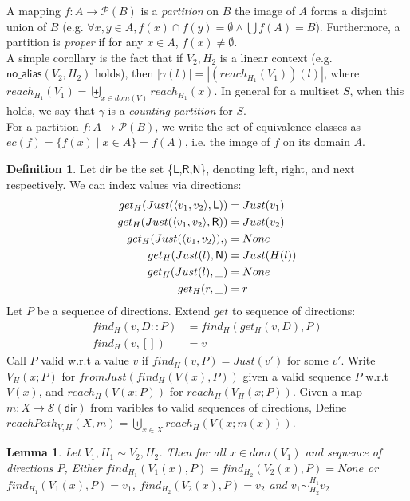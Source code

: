 \documentclass[11pt]{article}
\newcommand{\ms}[1]{\ensuremath{\mathsf{#1}}}
\newcommand{\na}[1]{\mathsf{no\_alias}(#1)}
\newcommand{\veq}[4]{#3 \sim^{#1}_{#2} #4}
\newtheorem{lemma}[theorem]{Lemma}
\theoremstyle{definition}
\newtheorem{definition}{Definition}[section]
\begin{document}
A mapping $f : A \to \mathcal{P}(B)$ is a \emph{partition} on $B$ the image of 
$A$ forms a disjoint union of $B$ 
(e.g. $\forall x,y \in A, f(x) \cap f(y) = \emptyset \land \bigcup f(A) = B$). Furthermore,
a partition is \emph{proper} if for any $x \in A$, $f(x) \neq \emptyset$.\\

A simple corollary is the fact that if $V_2,H_2$ is a linear context (e.g. $\na{V_2,H_2}$ holds), then
$|\gamma(l)| = |(reach_{H_1}(V_1))(l)|$, where $ reach_{H_1}(V_1) = \biguplus_{x \in dom(V)} reach_{H_1}(x)$. 
In general for a multiset $S$, when this holds, we say that 
$\gamma$ is a \emph{counting partition} for $S$.\\

For a partition $f : A \to \mathcal{P}(B)$, we write the set of equivalence classes
as $ec(f) = \{f(x) \mid x \in A\} = f(A)$, i.e. the image of $f$ on its domain $A$.\\

\begin{definition}
	Let \ms{dir} be the set \{\ms{L},\ms{R},\ms{N}\}, denoting left, right, and next 
	respectively. We can index values via directions:
	\begin{align*}
		get_H(Just(\pairexcst{v_1}{v_2},\ms{L})) &= Just(v_1)\\
		get_H(Just(\pairexcst{v_1}{v_2},\ms{R})) &= Just(v_2)\\
		get_H(Just(\pairexcst{v_1}{v_2}),_) &= None\\
		get_H(Just(l),\ms{N}) &= Just(H(l)) \\
		get_H(Just(l), \_) &= None\\
		get_H(r,\_) &= r
	\end{align*}
	Let $P$ be a sequence of directions. Extend $get$ to sequence of directions:
	\begin{align*}
		find_H(v,D::P) &= find_H(get_H(v,D),P)\\
		find_H(v,[]) &= v
	\end{align*}
	Call $P$ valid w.r.t a value $v$ if $find_H(v,P) = Just (v')$ for some $v'$.
	Write $V_H(x;P)$ for $fromJust(find_H(V(x),P))$ given a valid sequence $P$ w.r.t $V(x)$,
	and $reach_H(V(x;P))$ for $reach_H(V_H(x;P))$.
	Given a map $m : X \to \mathcal{S}(\ms{dir})$ from varibles to valid sequences of directions, 
	Define $reachPath_{V,H}(X,m) = \biguplus_{x \in X} reach_H(V(x;m(x)))$.
	
\end{definition}

\begin{lemma}
	Let $V_1,H_1 \sim V_2,H_2$. Then for all $x \in dom(V_1)$ and sequence of directions $P$, 
	Either $find_{H_1}(V_1(x),P) = find_{H_2}(V_2(x),P) = None$ or 
	$find_{H_1}(V_1(x),P) = v_1$, $find_{H_2}(V_2(x),P) = v_2$ and
	$\veq{H_1}{H_2}{v_1}{v_2}$
\end{lemma}
\end{document}

